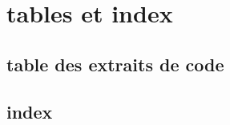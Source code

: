 \documentclass{scrartcl}%
\begin{document}
\section{tables et index}
\subsection{table des extraits de code}

\begin{multicols}{2}
\nowebchunks
\end{multicols}

\subsection{index}

\begin{multicols}{2}
\nowebindex
\end{multicols}
\end{document}
